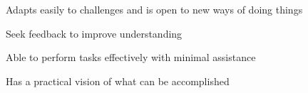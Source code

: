 


\begin{cvsimplelist}


    \item{Adapts easily to challenges and is open to new ways of doing things}
    \item{Seek feedback to improve understanding}
    \item{Able to perform tasks effectively with minimal assistance}
    \item{Has a practical vision of what can be accomplished}


\end{cvsimplelist}
